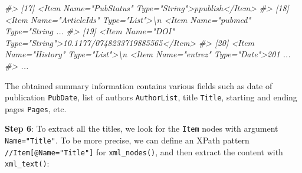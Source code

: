 \documentclass[
]{book}
\newenvironment{Shaded}{\begin{snugshade}}{\end{snugshade}}
\newcommand{\CommentTok}[1]{\textcolor[rgb]{0.56,0.35,0.01}{\textit{#1}}}
\begin{document}
\begin{Shaded}
\begin{Highlighting}[]
\CommentTok{\#\textgreater{} [17] \textless{}Item Name="PubStatus" Type="String"\textgreater{}ppublish\textless{}/Item\textgreater{}}
\CommentTok{\#\textgreater{} [18] \textless{}Item Name="ArticleIds" Type="List"\textgreater{}\textbackslash{}n  \textless{}Item Name="pubmed" Type="String ...}
\CommentTok{\#\textgreater{} [19] \textless{}Item Name="DOI" Type="String"\textgreater{}10.1177/0748233719885565\textless{}/Item\textgreater{}}
\CommentTok{\#\textgreater{} [20] \textless{}Item Name="History" Type="List"\textgreater{}\textbackslash{}n  \textless{}Item Name="entrez" Type="Date"\textgreater{}201 ...}
\CommentTok{\#\textgreater{} ...}
\end{Highlighting}
\end{Shaded}

The obtained summary information contains various fields such as date of
publication \texttt{PubDate}, list of authors \texttt{AuthorList}, title \texttt{Title}, starting
and ending pages \texttt{Pages}, etc.

\textbf{Step 6}: To extract all the titles, we look for the \texttt{Item} nodes with
argument \texttt{Name="Title"}. To be more precise, we can define an XPath pattern
\texttt{\textquotesingle{}//Item{[}@Name="Title"{]}\textquotesingle{}} for \texttt{xml\_nodes()}, and then extract the content
with \texttt{xml\_text()}:
\end{document}
